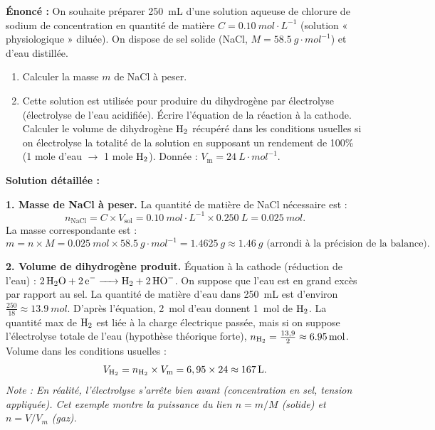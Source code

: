 \documentclass[11pt]{article}
\begin{document}
\begin{exoresolu}
\textbf{Énoncé :} On souhaite préparer \SI{250}{mL} d'une solution aqueuse de chlorure de sodium de concentration en quantité de matière $C = \SI{0,10}{mol\cdot L^{-1}}$ (solution « physiologique » diluée). On dispose de sel solide (NaCl, $M = \SI{58,5}{g\cdot mol^{-1}}$) et d'eau distillée.
\begin{enumerate}
    \item Calculer la masse $m$ de NaCl à peser.
    \item Cette solution est utilisée pour produire du dihydrogène par électrolyse (électrolyse de l'eau acidifiée). Écrire l'équation de la réaction à la cathode. Calculer le volume de dihydrogène $\ce{H2}$ récupéré dans les conditions usuelles si on électrolyse la totalité de la solution en supposant un rendement de 100\% (1 mole d'eau $\rightarrow$ 1 mole $\ce{H2}$). Donnée : $V_{\text{m}} = \SI{24}{L\cdot mol^{-1}}$.
\end{enumerate}
\par\textbf{Solution détaillée :}
\par\textbf{1. Masse de NaCl à peser.}
La quantité de matière de NaCl nécessaire est :
\[
n_{\text{NaCl}} = C \times V_{\text{sol}} = \SI{0,10}{mol\cdot L^{-1}} \times \SI{0,250}{L} = \SI{0,025}{mol}.
\]
La masse correspondante est :
\[
m = n \times M = \SI{0,025}{mol} \times \SI{58,5}{g\cdot mol^{-1}} = \SI{1,4625}{g} \approx \SI{1,46}{g} \text{ (arrondi à la précision de la balance)}.
\]
\par\textbf{2. Volume de dihydrogène produit.}
Équation à la cathode (réduction de l'eau) : $\ce{2H2O + 2e- -> H2 + 2HO-}$.
On suppose que l'eau est en grand excès par rapport au sel. La quantité de matière d'eau dans \SI{250}{mL} est d'environ $\frac{250}{18} \approx \SI{13,9}{mol}$.
D'après l'équation, \SI{2}{mol} d'eau donnent \SI{1}{mol} de $\ce{H2}$. La quantité max de $\ce{H2}$ est liée à la charge électrique passée, mais si on suppose l'électrolyse totale de l'eau (hypothèse théorique forte), $n_{\ce{H2}} = \frac{13,9}{2} \approx \SI{6,95}{mol}$.
Volume dans les conditions usuelles :
\[
V_{\ce{H2}} = n_{\ce{H2}} \times V_{\text{m}} = 6,95 \times 24 \approx \SI{167}{L}.
\]
\textit{Note : En réalité, l'électrolyse s'arrête bien avant (concentration en sel, tension appliquée). Cet exemple montre la puissance du lien $n = m/M$ (solide) et $n = V/V_m$ (gaz).}
\end{exoresolu}
\end{document}
